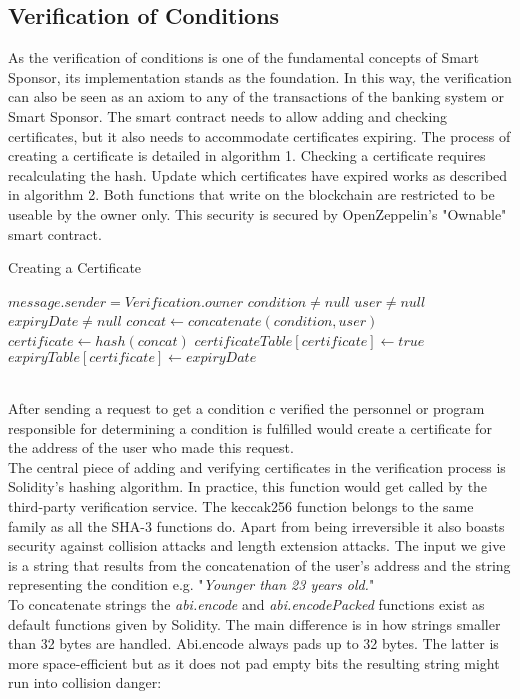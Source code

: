\subsection{Verification of Conditions}
As the verification of conditions is one of the fundamental concepts of Smart Sponsor, its implementation stands as the foundation. In this way, the verification can also be seen as an axiom to any of the transactions of the banking system or Smart Sponsor. The smart contract needs to allow adding and checking certificates, but it also needs to accommodate certificates expiring. The process of creating a certificate is detailed in algorithm 1. Checking a certificate requires recalculating the hash. Update which certificates have expired works as described in algorithm 2. Both functions that write on the blockchain are restricted to be useable by the owner only. This security is secured by OpenZeppelin's "Ownable" smart contract\cite{Zeppelin}.\\
\begin{algorithm}
\caption{Creating a Certificate}\label{alg:create}
\begin{algorithmic}
\Require $message.sender = Verification.owner$
\Require $condition \neq null$
\Require $user \neq null$
\Require $expiryDate \neq null$
\State $concat \gets concatenate(condition, user)$ 
\State $certificate \gets hash(concat)$
    \State $certificateTable[certificate] \gets true $
\EndIf
\State $expiryTable[certificate] \gets expiryDate$
\end{algorithmic}
\end{algorithm}
\\
After sending a request to get a condition c verified the personnel or program responsible for determining a condition is fulfilled would create a certificate for the address of the user who made this request.\\
The central piece of adding and verifying certificates in the verification process is Solidity's hashing algorithm. In practice, this function would get called by the third-party verification service. The keccak256 function belongs to the same family as all the SHA-3 functions do. Apart from being irreversible it also boasts security against collision attacks and length extension attacks. The input we give is a string that results from the concatenation of the user's address and the string representing the condition e.g. "\emph{Younger than 23 years old.}"\\
To concatenate strings the \emph{abi.encode} and \emph{abi.encodePacked} functions exist as default functions given by Solidity. The main difference is in how strings smaller than 32 bytes are handled. Abi.encode always pads up to 32 bytes. The latter is more space-efficient but as it does not pad empty bits the resulting string might run into collision danger:
